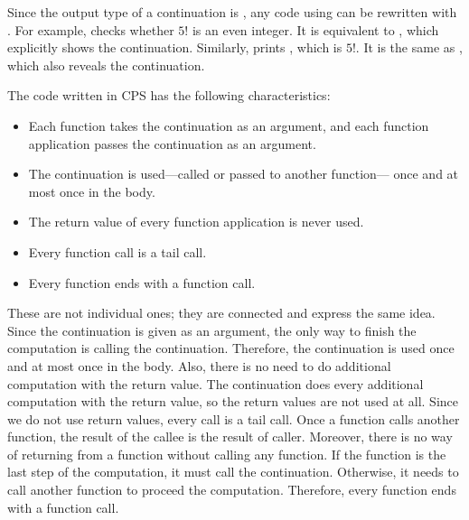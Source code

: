 Since the output type of a continuation is , any code using
 can be rewritten with . For example,
 checks whether $5!$ is an even integer. It is
equivalent to , which explicitly shows
the continuation. Similarly,  prints ,
which is $5!$. It is the same as , which also
reveals the continuation.

The code written in CPS has the following characteristics:
\begin{itemize}
  \item Each function takes the continuation as an argument, and each function
    application passes the continuation as an argument.
  \item The continuation is used---called or passed to another function---
    once and at most once in the body.
  \item The return value of every function application is never used.
  \item Every function call is a tail call.
  \item Every function ends with a function call.
\end{itemize}
These are not individual ones; they are connected and express the same idea.
Since the continuation is given as an argument, the only way to finish the
computation is calling the continuation. Therefore, the continuation is used
once and at most once in the body. Also, there is no need to do additional
computation with the return value. The continuation does every additional
computation with the return value, so the return values are not used at all.
Since we do not use return
values, every call is a tail call. Once a function calls another
function, the result of the callee is the result of caller. Moreover, there is no
way of returning from a function without calling any function. If the function
is the last step of the computation, it must call the continuation. Otherwise,
it needs to call another function to proceed the computation. Therefore, every
function ends with a function call.


